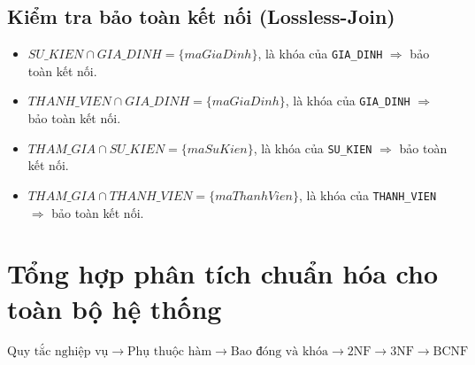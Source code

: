 \subsection{Kiểm tra bảo toàn kết nối (Lossless-Join)}

\begin{itemize}
    \item $SU\_KIEN \cap GIA\_DINH = \{maGiaDinh\}$, là khóa của \texttt{GIA\_DINH} $\Rightarrow$ bảo toàn kết nối.
    \item $THANH\_VIEN \cap GIA\_DINH = \{maGiaDinh\}$, là khóa của \texttt{GIA\_DINH} $\Rightarrow$ bảo toàn kết nối.
    \item $THAM\_GIA \cap SU\_KIEN = \{maSuKien\}$, là khóa của \texttt{SU\_KIEN} $\Rightarrow$ bảo toàn kết nối.
    \item $THAM\_GIA \cap THANH\_VIEN = \{maThanhVien\}$, là khóa của \texttt{THANH\_VIEN} $\Rightarrow$ bảo toàn kết nối.
\end{itemize}

\section{Tổng hợp phân tích chuẩn hóa cho toàn bộ hệ thống}

\[
\text{Quy tắc nghiệp vụ}
\rightarrow
\text{Phụ thuộc hàm}
\rightarrow
\text{Bao đóng và khóa}
\rightarrow
\text{2NF}
\rightarrow
\text{3NF}
\rightarrow
\text{BCNF}
\]

